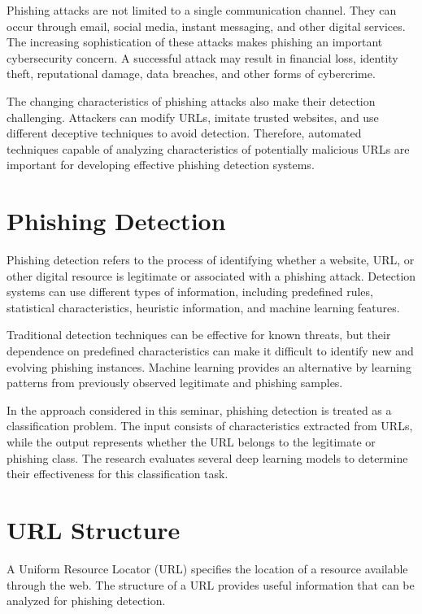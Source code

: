 \documentclass[12pt,a4paper]{report}
\begin{document}
Phishing attacks are not limited to a single communication channel.
They can occur through email, social media, instant messaging, and
other digital services. The increasing sophistication of these
attacks makes phishing an important cybersecurity concern. A
successful attack may result in financial loss, identity theft,
reputational damage, data breaches, and other forms of cybercrime.

The changing characteristics of phishing attacks also make their
detection challenging. Attackers can modify URLs, imitate trusted
websites, and use different deceptive techniques to avoid detection.
Therefore, automated techniques capable of analyzing characteristics
of potentially malicious URLs are important for developing effective
phishing detection systems.

\section{Phishing Detection}

Phishing detection refers to the process of identifying whether a
website, URL, or other digital resource is legitimate or associated
with a phishing attack. Detection systems can use different types of
information, including predefined rules, statistical characteristics,
heuristic information, and machine learning features.

Traditional detection techniques can be effective for known threats,
but their dependence on predefined characteristics can make it
difficult to identify new and evolving phishing instances. Machine
learning provides an alternative by learning patterns from previously
observed legitimate and phishing samples.

In the approach considered in this seminar, phishing detection is
treated as a classification problem. The input consists of
characteristics extracted from URLs, while the output represents
whether the URL belongs to the legitimate or phishing class. The
research evaluates several deep learning models to determine their
effectiveness for this classification task.

\section{URL Structure}

A Uniform Resource Locator (URL) specifies the location of a resource
available through the web. The structure of a URL provides useful
information that can be analyzed for phishing detection.
\end{document}
